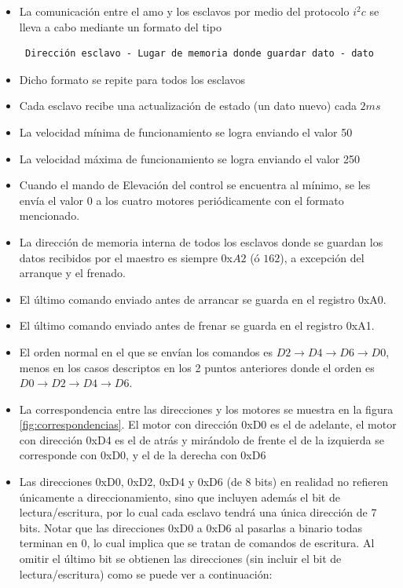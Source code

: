 \documentclass[main]{subfiles}
\begin{document}
\begin{itemize}
\item La comunicación entre el amo y los esclavos por medio del protocolo $i^2c$ se lleva a cabo mediante un  formato del tipo \begin{verbatim} Dirección esclavo - Lugar de memoria donde guardar dato - dato \end{verbatim}
\item Dicho formato se repite para todos los esclavos
\item Cada esclavo recibe una actualización de estado (un dato nuevo) cada $2 ms$
\item La velocidad mínima de funcionamiento se logra enviando el valor 50
\item La velocidad máxima de funcionamiento se logra enviando el valor 250
\item Cuando el mando de Elevación del control se encuentra al mínimo, se les envía el valor 0 a los cuatro motores periódicamente con el formato mencionado.
\item La dirección de memoria interna de todos los esclavos donde se guardan los datos recibidos por el maestro es siempre 0x$A2$ (ó $162$), a excepción del arranque y el frenado.
\item El último comando enviado antes de arrancar se guarda en el registro 0xA0.
\item El último comando enviado antes de frenar se guarda en el registro 0xA1.
\item El orden normal en el que se envían los comandos es $D2\rightarrow D4\rightarrow D6\rightarrow D0$, menos en los casos descriptos en los 2 puntos anteriores donde el orden es $D0\rightarrow D2\rightarrow D4\rightarrow D6$.
\item La correspondencia entre las direcciones y los motores se muestra en la figura \ref{fig:correspondencias}. El motor con dirección 0xD0 es el de adelante, el motor con dirección 0xD4 es el de atrás y mirándolo de frente el de la izquierda se corresponde con 0xD0, y el de la derecha con 0xD6
\item Las direcciones 0xD0, 0xD2, 0xD4 y 0xD6 (de 8 bits) en realidad no refieren únicamente a direccionamiento, sino que incluyen además el bit de lectura/escritura, por lo cual cada esclavo tendrá una única dirección de 7 bits. Notar que las direcciones 0xD0 a 0xD6 al pasarlas a binario todas terminan en 0, lo cual implica que se tratan de comandos de escritura. Al omitir el último bit se obtienen las direcciones (sin incluir el bit de lectura/escritura) como se puede ver a continuación:

\end{itemize}
\end{document}
